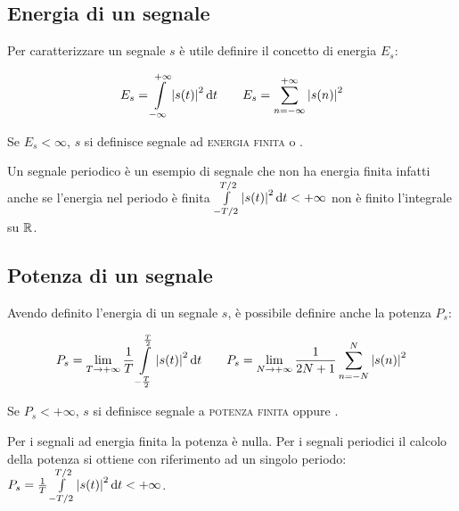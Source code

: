 \subsection{Energia di un segnale}
Per caratterizzare un segnale $s$ è utile definire il concetto di energia $E_s$:

\begin{equation}\label{eq:segnale_energia}
E_s=\int\limits_{-\infty}^{+\infty}{\left|{s(t)}\right|^2}{\,\mathop{}\!\mathrm{d}{t}} \qquad E_s=\sum_{n=-\infty}^{+\infty}\left|{s(n)}\right|^2 
\end{equation}

Se $E_s < \infty$, $s$  si definisce segnale ad \textsc{energia finita} o .

Un segnale periodico è un esempio di segnale che non ha energia finita infatti anche se l'energia nel periodo è finita $\int\limits_{-T/2}^{T/2}{\left|{s(t)}\right|^2}{\,\mathop{}\!\mathrm{d}{t}}<+\infty$ non è finito l'integrale su $\mathbb{R}$.

\subsection{Potenza di un segnale}
Avendo definito l'energia di un segnale $s$, è possibile definire anche la potenza $P_s$: 

\begin{equation}\label{eq:segnale_potenza}
P_s=\lim\limits_{T\to+\infty}{\frac{1}{T}\int\limits_{-\frac{T}{2}}^{\frac{T}{2}}{\left|{s(t)}\right|^2}{\,\mathop{}\!\mathrm{d}{t}}}   \qquad  P_s=\lim\limits_{N\to+\infty}{\frac{1}{2N+1}\sum_{n=-N}^{N}{\left|{s(n)}\right|^2}}
\end{equation}

Se $P_s<+\infty$, $s$ si definisce segnale a \textsc{potenza finita} oppure .

Per i segnali ad energia finita la potenza è nulla. Per i segnali periodici il calcolo della potenza si ottiene con riferimento ad un singolo periodo: $P_s=\frac{1}{T}\int\limits_{-T/2}^{T/2}{\left|{s(t)}\right|^2}{\,\mathop{}\!\mathrm{d}{t}}<+\infty$.

%
%

